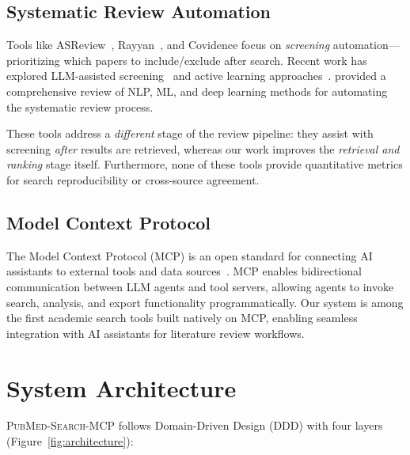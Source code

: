 \documentclass[11pt,a4paper]{article}
\newcommand{\system}{\textsc{PubMed-Search-MCP}}
\begin{document}
\subsection{Systematic Review Automation}

Tools like ASReview~\citep{van2021asreview}, Rayyan~\citep{ouzzani2016rayyan}, and Covidence focus on \emph{screening} automation---prioritizing which papers to include/exclude after search.
Recent work has explored LLM-assisted screening~\citep{syriani2023llm,guo2024llm} and active learning approaches~\citep{abualsaud2021symbals}.
\citet{wang2024automation} provided a comprehensive review of NLP, ML, and deep learning methods for automating the systematic review process.

These tools address a \emph{different} stage of the review pipeline: they assist with screening \emph{after} results are retrieved, whereas our work improves the \emph{retrieval and ranking} stage itself.
Furthermore, none of these tools provide quantitative metrics for search reproducibility or cross-source agreement.

\subsection{Model Context Protocol}

The Model Context Protocol (MCP) is an open standard for connecting AI assistants to external tools and data sources~\citep{anthropic2024mcp}.
MCP enables bidirectional communication between LLM agents and tool servers, allowing agents to invoke search, analysis, and export functionality programmatically.
Our system is among the first academic search tools built natively on MCP, enabling seamless integration with AI assistants for literature review workflows.

\section{System Architecture}
\label{sec:architecture}

\system{} follows Domain-Driven Design (DDD) with four layers (Figure~\ref{fig:architecture}):
\end{document}
